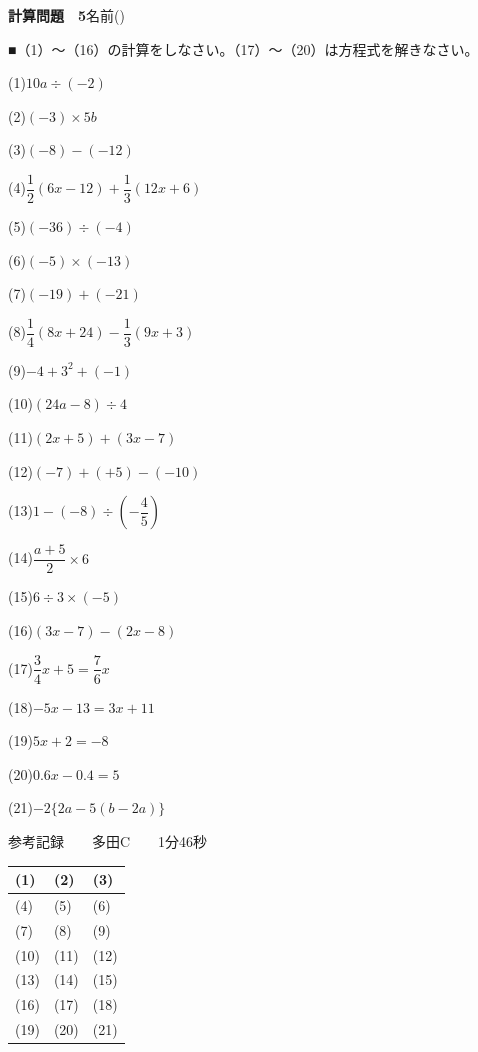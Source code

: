 \documentclass[a4paper,11pt]{ltjsarticle}
\newlength{\qcol}\setlength{\qcol}{0.47\textwidth}
\newlength{\qgap}
\newlength{\anscolw}\setlength{\anscolw}{0.30\textwidth}
\newlength{\ansh}
\newcommand{\Q}[2]{\parbox[t]{\qcol}{\raggedright (#1)\hspace{0.6em}$\displaystyle #2$}}
\newcommand{\QR}[4]{\Q{#1}{#2}\hfill\Q{#3}{#4}\par\vspace{\qgap}}
\newcommand{\anscell}[1]{\rule[-\ansdrop]{0pt}{\ansh}(#1)}
\newlength{\ansdrop}
\begin{document}
{\large\bfseries 計算問題　5}\hfill 名前(\underline{\hspace{32mm}})\par\vspace{3mm}
■（1）〜（16）の計算をしなさい。（17）〜（20）は方程式を解きなさい。\par\vspace{3mm}
\setlength{\qgap}{5.4mm}
\QR{1}{10a\div(-2)}{2}{(-3)\times5b}
\QR{3}{(-8)-(-12)}{4}{\dfrac{1}{2}(6x-12)+\dfrac{1}{3}(12x+6)}
\QR{5}{(-36)\div(-4)}{6}{(-5)\times(-13)}
\QR{7}{(-19)+(-21)}{8}{\dfrac{1}{4}(8x+24)-\dfrac{1}{3}(9x+3)}
\QR{9}{-4+3^2+(-1)}{10}{(24a-8)\div4}
\QR{11}{(2x+5)+(3x-7)}{12}{(-7)+(+5)-(-10)}
\QR{13}{1-(-8)\div\left(-\dfrac{4}{5}\right)}{14}{\dfrac{a+5}{2}\times6}
\QR{15}{6\div3\times(-5)}{16}{(3x-7)-(2x-8)}
\QR{17}{\dfrac{3}{4}x+5=\dfrac{7}{6}x}{18}{-5x-13=3x+11}
\QR{19}{5x+2=-8}{20}{0.6x-0.4=5}
\vspace{1mm}
\Q{21}{-2\{2a-5(b-2a)\}}\par\vspace{3mm}
{\small 参考記録　　多田C　　1分46秒}\par
\vspace{2mm}
\setlength{\ansh}{9.5mm}\setlength{\ansdrop}{6mm}%
\begin{center}\begin{tabular}{|p{\anscolw}|p{\anscolw}|p{\anscolw}|}\hline
\anscell{1} & \anscell{2} & \anscell{3} \\\hline
\anscell{4} & \anscell{5} & \anscell{6} \\\hline
\anscell{7} & \anscell{8} & \anscell{9} \\\hline
\anscell{10} & \anscell{11} & \anscell{12} \\\hline
\anscell{13} & \anscell{14} & \anscell{15} \\\hline
\anscell{16} & \anscell{17} & \anscell{18} \\\hline
\anscell{19} & \anscell{20} & \anscell{21} \\\hline
\end{tabular}\end{center}
\end{document}

